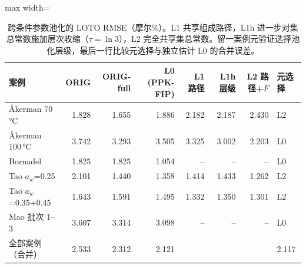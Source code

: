 \begin{table}[t]
\centering
\caption{跨条件参数池化的 LOTO RMSE（摩尔\%）。L1 共享组成路径，L1h 进一步对集总常数施加层次收缩（$\tau=\ln3$），L2 完全共享集总常数。留一案例元验证选择池化层级，最后一行比较元选择与独立估计 L0 的合并误差。}\label{tab:pooling}
\footnotesize
\begin{adjustbox}{max width=\linewidth}
\begin{tabular}{lrrrrrrl}
\toprule
案例 & ORIG & ORIG-full & L0 (PPK-FIP) & L1 路径 & L1h 层级 & L2 路径+$F$ & 元选择 \\
\midrule
Åkerman 70\,°C & 1.828 & 1.655 & 1.886 & 2.182 & 2.187 & 2.430 & L2 \\
Åkerman 100\,°C & 3.742 & 3.293 & 3.505 & 3.325 & 3.002 & 2.203 & L0 \\
Bornadel & 1.825 & 1.825 & 1.054 & -- & -- & -- & L0 \\
Tao $a_w$=0.25 & 2.101 & 1.440 & 1.358 & 1.414 & 1.433 & 1.262 & L2 \\
Tao $a_w$=0.35+0.45 & 1.643 & 1.591 & 1.495 & 1.332 & 1.350 & 1.301 & L2 \\
Mao 批次 1--3 & 3.607 & 3.314 & 3.098 & -- & -- & -- & L0 \\
\midrule
全部案例（合并） & 2.533 & 2.312 & 2.121 &  &  &  & 2.117 \\
\bottomrule
\end{tabular}
\end{adjustbox}
\end{table}
